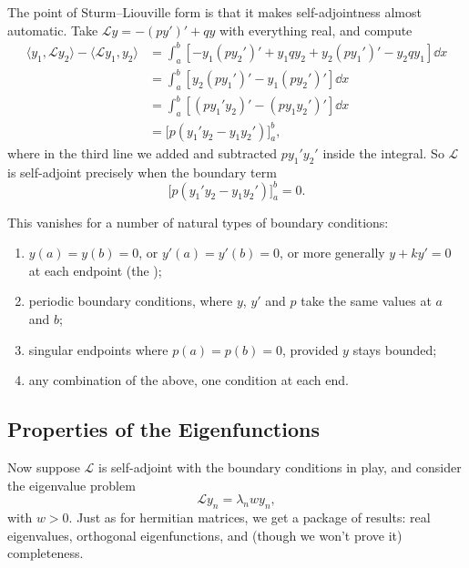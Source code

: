 \documentclass[a4paper]{scrartcl}
\begin{document}
The point of Sturm--Liouville form is that it makes self-adjointness almost automatic. Take $\mathcal{L}y = -(py')' + qy$ with everything real, and compute
\begin{align*}
    \langle y_1, \mathcal{L} y_2\rangle - \langle \mathcal{L}y_1, y_2 \rangle
    &= \int_a^b \left[-y_1 (p y_2')' + y_1 q y_2 + y_2 (p y_1')' - y_2 q y_1 \right] \dd x \\
    &= \int_a^b \left[y_2 (p y_1')' - y_1 (p y_2')'\right] \dd x \\
    &= \int_a^b \left[(p y_1' y_2)' - (p y_1 y_2')'\right] \dd x \\
    &= \Big[ p (y_1' y_2 - y_1 y_2')\Big]_a^b,
\end{align*}
where in the third line we added and subtracted $p y_1' y_2'$ inside the integral.
So $\mathcal{L}$ is self-adjoint precisely when the boundary term
$$
\Big[ p (y_1' y_2 - y_1 y_2')\Big]_a^b = 0.
$$

This vanishes for a number of natural types of boundary conditions:
\begin{enumerate}[label=(\roman*)]
    \item $y(a) = y(b) = 0$, or $y'(a) = y'(b) = 0$, or more generally $y + k y' = 0$ at each endpoint (the );
    \item periodic boundary conditions, where $y$, $y'$ and $p$ take the same values at $a$ and $b$;
    \item singular endpoints where $p(a) = p(b) = 0$, provided $y$ stays bounded;
    \item any combination of the above, one condition at each end.
\end{enumerate}

\subsection{Properties of the Eigenfunctions}

Now suppose $\mathcal{L}$ is self-adjoint with the boundary conditions in play, and consider the eigenvalue problem
$$
\mathcal{L} y_n = \lambda_n w y_n,
$$
with $w > 0$. Just as for hermitian matrices, we get a package of results: real eigenvalues, orthogonal eigenfunctions, and (though we won't prove it) completeness.
\end{document}
